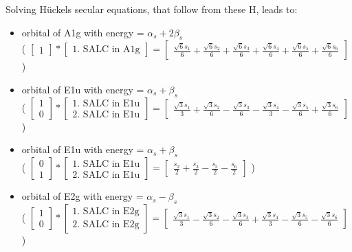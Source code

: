 \documentclass[12pt,a4paper]{article}
\begin{document}
Solving Hückels secular equations, that follow from these H, leads to:
\begin{itemize}
\item orbital of A1g with energy = $\alpha_{s} + 2 \beta_{s}$ \\
                            ( $\left[\begin{matrix}1\end{matrix}\right] * \left[\begin{array}{c}\text{1. SALC in A1g}\end{array}\right] = \left[\begin{matrix}\frac{\sqrt{6} s_{1}}{6} + \frac{\sqrt{6} s_{2}}{6} + \frac{\sqrt{6} s_{3}}{6} + \frac{\sqrt{6} s_{4}}{6} + \frac{\sqrt{6} s_{5}}{6} + \frac{\sqrt{6} s_{6}}{6}\end{matrix}\right] $ )
\item orbital of E1u with energy = $\alpha_{s} + \beta_{s}$ \\
                            ( $\left[\begin{matrix}1\\0\end{matrix}\right] * \left[\begin{array}{c}\text{1. SALC in E1u} \\ \text{2. SALC in E1u}\end{array}\right] = \left[\begin{matrix}\frac{\sqrt{3} s_{1}}{3} + \frac{\sqrt{3} s_{2}}{6} - \frac{\sqrt{3} s_{3}}{6} - \frac{\sqrt{3} s_{4}}{3} - \frac{\sqrt{3} s_{5}}{6} + \frac{\sqrt{3} s_{6}}{6}\end{matrix}\right] $ )
\item orbital of E1u with energy = $\alpha_{s} + \beta_{s}$ \\
                            ( $\left[\begin{matrix}0\\1\end{matrix}\right] * \left[\begin{array}{c}\text{1. SALC in E1u} \\ \text{2. SALC in E1u}\end{array}\right] = \left[\begin{matrix}\frac{s_{2}}{2} + \frac{s_{3}}{2} - \frac{s_{5}}{2} - \frac{s_{6}}{2}\end{matrix}\right] $ )
\item orbital of E2g with energy = $\alpha_{s} - \beta_{s}$ \\
                            ( $\left[\begin{matrix}1\\0\end{matrix}\right] * \left[\begin{array}{c}\text{1. SALC in E2g} \\ \text{2. SALC in E2g}\end{array}\right] = \left[\begin{matrix}\frac{\sqrt{3} s_{1}}{3} - \frac{\sqrt{3} s_{2}}{6} - \frac{\sqrt{3} s_{3}}{6} + \frac{\sqrt{3} s_{4}}{3} - \frac{\sqrt{3} s_{5}}{6} - \frac{\sqrt{3} s_{6}}{6}\end{matrix}\right] $ )

\end{itemize}
\end{document}
